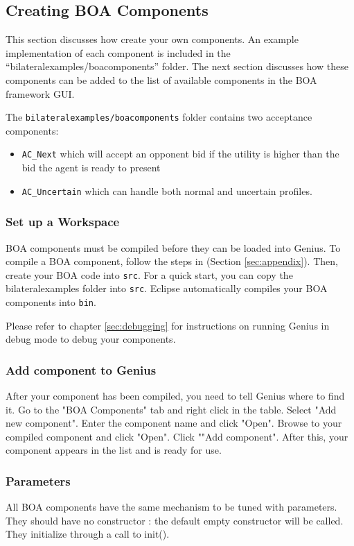 \documentclass[]{article}
\newcommand\Genius{{\sc Genius}}
\begin{document}
\subsection{Creating BOA Components} \label{sec:creating-boa-components}
This section discusses how create your own components. An example implementation of each component is included in the ``bilateralexamples/boacomponents'' folder. The next section discusses how these components can be added to the list of available components in the BOA framework GUI. 

The \verb|bilateralexamples/boacomponents| folder contains two acceptance components:
\begin{itemize}
\item \verb|AC_Next| which  will accept an opponent bid if the utility is higher than the bid the agent is ready to present
\item \verb|AC_Uncertain| which can handle both normal and uncertain profiles.
\end{itemize}

\subsubsection{Set up a Workspace}
BOA components must be compiled before they can be loaded into Genius.
To compile a BOA component, follow the steps in (Section \ref{sec:appendix}). Then, create your BOA code into \verb|src|. For a quick start, you can copy the bilateralexamples folder into \verb|src|. Eclipse automatically compiles your BOA components into \verb|bin|.

Please refer to chapter \ref{sec:debugging} for instructions on running {\Genius} in debug mode to debug your components. 

\subsubsection{Add component to Genius}
After your component has been compiled, you need to tell Genius where to find it.
Go to the "BOA Components" tab and right click in the table. Select "Add new component". Enter the component name and click "Open". Browse to your compiled component and click "Open". Click ""Add component". After this, your component appears in the list and is ready for use.  

\subsubsection{Parameters}
All BOA components have the same mechanism to be tuned with parameters. They should have no constructor : the default empty constructor will be called. They initialize through a call to init().
\end{document}
